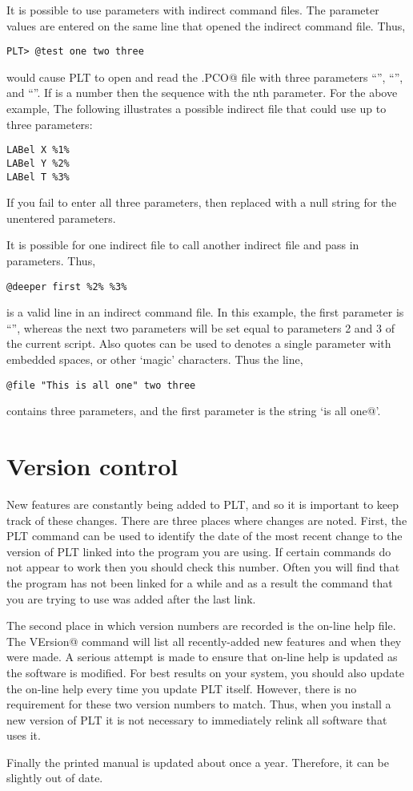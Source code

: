 It is possible to use parameters with indirect command files.
The parameter values are entered on the same line that
opened the indirect command file.
Thus,
\begin{verbatim}
PLT> @test one two three
\end{verbatim}
would cause PLT to open and read the \verb@TEST.PCO@ file with three
parameters ``\verb@one@'', ``\verb@two@'', and ``\verb@three@''.
If \verb@n@ is a number then the sequence \verb@%n%@ will be replaced
with the nth parameter.
For the above example, \verb@%1%@ will be replaced with `\verb@one@',
\verb@%2%@ with `\verb@two@', {\it etc.}
The following illustrates a possible indirect file that could use
up to three parameters:
\begin{verbatim}
LABel X %1%
LABel Y %2%
LABel T %3%
\end{verbatim}
If you fail to enter all three parameters, then \verb@%n%@ will be
replaced with a null string for the unentered parameters.

It is possible for one indirect file to call another indirect file
and pass in parameters.
Thus,
\begin{verbatim}
@deeper first %2% %3%
\end{verbatim}
is a valid line in an indirect command file.
In this example, the first parameter is ``\verb@first@'',
whereas the next two parameters will be set equal to
parameters 2 and 3 of the current script.
Also quotes can be used to denotes a single parameter with embedded
spaces, or other `magic' characters.
Thus the line,
\begin{verbatim}
@file "This is all one" two three
\end{verbatim}
contains three parameters, and the first parameter is the string
`\verb@This is all one@'.

\section{Version control}
New features are constantly being added to PLT, and so it is important
to keep track of these changes.
There are three places where changes are noted.
First, the PLT \verb@VErsion@ command can be used to identify the
date of the most recent change to the version of PLT linked into the program
you are using.
If certain commands do not appear to work then you should check this
number.
Often you will find that the program has not been linked for a while
and as a result the
command that you are trying to use was added after the last link.

The second place in which version numbers are recorded is the on-line
help file.
The \verb@HElp VErsion@ command will list all recently-added new
features and when they were made.
A serious attempt is made to ensure that on-line help is updated as
the software is modified.
For best results on your system,
you should also update the on-line help every time you update PLT
itself.
However, there is no requirement for these two version numbers to
match.
Thus, when you install a new version of PLT it is not necessary to
immediately relink all software that uses it.

Finally the printed manual is updated about once a year.  Therefore,
it can be slightly out of date.
